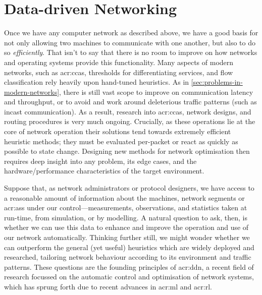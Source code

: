 \chapter{Data-driven Networking}
Once we have any computer network as described above, we have a good basis for not only allowing two machines to communicate with one another, but also to do so \emph{efficiently}.
That isn't to say that there is no room to improve on how networks and operating systems provide this functionality.
Many aspects of modern networks, such as \glspl{acr:cca}, thresholds for differentiating services, and flow classification rely heavily upon hand-tuned heuristics.
As in \cref{sec:problems-in-modern-networks}, there is still vast scope to improve on communication latency and throughput, or to avoid and work around deleterious traffic patterns (such as incast communication).
As a result, research into \glspl{acr:cca}, network designs, and routing procedures is very much ongoing.
Crucially, as these operations lie at the core of network operation their solutions tend towards extremely efficient heuristic methods; they must be evaluated per-packet or react as quickly as possible to state change.
Designing new methods for network optimisation then requires deep insight into any problem, its edge cases, and the hardware/performance characteristics of the target environment.

Suppose that, as network administrators or protocol designers, we have access to a reasonable amount of information about the machines, network segments or \glspl{acr:as} under our control---measurements, observations, and statistics taken at run-time, from simulation, or by modelling.
A natural question to ask, then, is whether we can use this data to enhance and improve the operation and use of our network automatically.
Thinking further still, we might wonder whether we can outperform the general (yet useful) heuristics which are widely deployed and researched, tailoring network behaviour according to its environment and traffic patterns.
These questions are the founding principles of \gls{acr:ddn}, a recent field of research focussed on the automatic control and optimisation of network systems, which has sprung forth due to recent advances in \gls{acr:ml} and \gls{acr:rl}.

